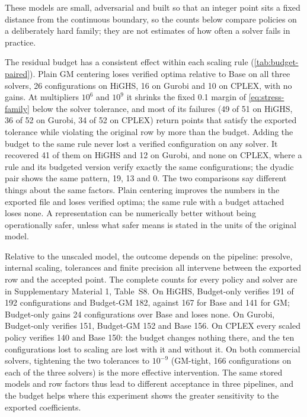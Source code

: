 \documentclass[11pt]{article}
\theoremstyle{definition}
\theoremstyle{remark}
\begin{document}
These models are small, adversarial and built so that an integer point sits a fixed distance
from the continuous boundary, so the counts below compare policies on a deliberately hard
family; they are not estimates of how often a solver fails in practice.

The residual budget has a consistent effect within each scaling rule
(\cref{tab:budget-paired}). Plain GM centering loses verified optima relative to Base on all
three solvers, 26 configurations on HiGHS, 16 on Gurobi and 10 on CPLEX, with no gains. At
multipliers $10^6$ and $10^9$ it shrinks the fixed 0.1 margin of \eqref{eq:stress-family} below
the solver tolerance, and most of its failures (49 of 51 on HiGHS, 36 of 52 on Gurobi, 34 of 52
on CPLEX) return points that satisfy the exported tolerance while violating the original row by
more than the budget. Adding the budget to the same rule never lost a verified configuration on
any solver. It recovered 41 of them on HiGHS and 12 on Gurobi, and none on CPLEX, where a rule
and its budgeted version verify exactly the same configurations; the dyadic pair shows the same
pattern, 19, 13 and 0. The two comparisons say different things about the same factors. Plain
centering improves the numbers in the exported file and loses verified optima; the same rule
with a budget attached loses none. A representation can be numerically better without being
operationally safer, unless what safer means is stated in the units of the original model.

Relative to the unscaled model, the outcome depends on the pipeline: presolve, internal
scaling, tolerances and finite precision all intervene between the exported row and the
accepted point. The complete
counts for every policy and solver are in Supplementary Material 1, Table~S8. On HiGHS, Budget-only
verifies 191 of 192 configurations and Budget-GM 182, against 167 for Base and 141 for GM;
Budget-only gains 24 configurations over Base and loses none. On Gurobi, Budget-only verifies
151, Budget-GM 152 and Base 156. On CPLEX every scaled policy verifies 140 and Base 150: the
budget changes nothing there, and the ten configurations lost to scaling are lost with it and
without it. On both commercial solvers, tightening the two tolerances to $10^{-9}$ (GM-tight,
166 configurations on each of the three solvers) is the more effective intervention. The same
stored models and row factors thus lead to different acceptance in three pipelines, and the
budget helps where this experiment shows the greater sensitivity to the exported coefficients.
\end{document}
